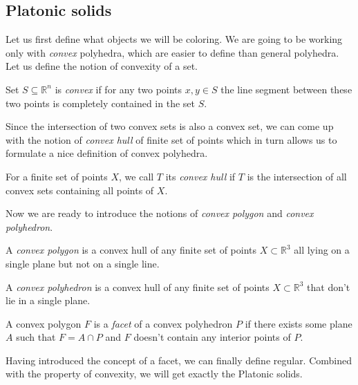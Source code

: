 \begin{redtext}
    


\section{Platonic solids}

Let us first define what objects we will be coloring. We are going to be working only with \emph{convex} polyhedra, which are easier to define than general polyhedra. Let us define the notion of convexity of a set.

\begin{define}
Set $S\subseteq\mathbb{R}^{n}$ is {\sl convex} if for any two points $x,y\in S$ the line segment between these two points is completely contained in the set $S$.
\end{define}

Since the intersection of two convex sets is also a convex set, we can come up with the notion of \emph{convex hull} of finite set of points which in turn allows us to formulate a nice definition of convex polyhedra.

\begin{define}
For a finite set of points $X$, we call $T$ its {\sl convex hull} if $T$ is the intersection of all convex sets containing all points of $X$.
\end{define}

Now we are ready to introduce the notions of \emph{convex polygon} and \emph{convex polyhedron}.

\begin{define}
A {\sl convex polygon} is a convex hull of any finite set of points $X \subset \mathbb{R}^3$ all lying on a single plane but not on a single line.
\end{define}

\begin{define}
A {\sl convex polyhedron} is a convex hull of any finite set of points $X \subset \mathbb{R}^3$ that don't lie in a single plane.
\end{define}

\begin{define}
A convex polygon $F$ is a {\sl facet} of a convex polyhedron $P$ if there exists some plane $A$ such that $F=A\cap P$ and $F$ doesn't contain any interior points of $P$.
\end{define}

Having introduced the concept of a facet, we can finally define regular. Combined with the property of convexity, we will get exactly the Platonic solids.


\end{redtext}
